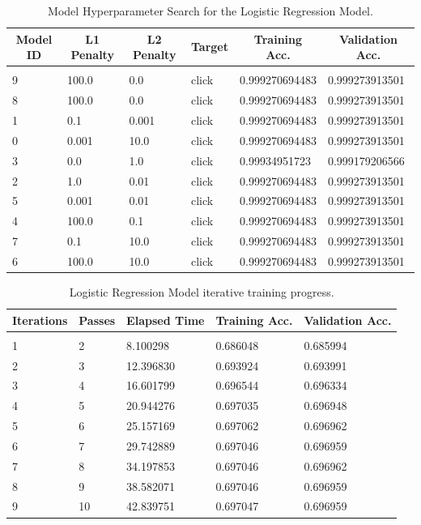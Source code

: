 \documentclass{article} %
\begin{document}
\begin{table}[!htbp]
\caption{Model Hyperparameter Search for the Logistic Regression Model.}
\label{table:19}
\begin{center}
\begin{tabular}{l l l l l l}
\multicolumn{1}{c}{\bf Model ID} & \multicolumn{1}{c}{\bf L1 Penalty} & \multicolumn{1}{c}{\bf L2 Penalty} & \multicolumn{1}{c}{\bf Target} & \multicolumn{1}{c}{\bf Training Acc.} & \multicolumn{1}{c}{\bf Validation Acc.}
\\ \hline \\
9 & 100.0 & 0.0   & click & 0.999270694483 & 0.999273913501\\
8 & 100.0 & 0.0   & click & 0.999270694483 & 0.999273913501\\
1 & 0.1   & 0.001 & click & 0.999270694483 & 0.999273913501\\
0 & 0.001 & 10.0  & click & 0.999270694483 & 0.999273913501\\
3 & 0.0   & 1.0   & click & 0.99934951723  & 0.999179206566\\
2 & 1.0   & 0.01  & click & 0.999270694483 & 0.999273913501\\
5 & 0.001 & 0.01  & click & 0.999270694483 & 0.999273913501\\
4 & 100.0 & 0.1   & click & 0.999270694483 & 0.999273913501\\
7 & 0.1   & 10.0  & click & 0.999270694483 & 0.999273913501\\
6 & 100.0 & 10.0  & click & 0.999270694483 & 0.999273913501\\
\end{tabular}
\end{center}
\end{table}

\begin{table}[!htbp]
\caption{Logistic Regression Model iterative training progress.}
\label{table:20}
\begin{center}
\begin{tabular}{l l l l l}
\multicolumn{1}{c}{\bf Iterations} & \multicolumn{1}{c}{\bf Passes} & \multicolumn{1}{c}{\bf Elapsed Time} & \multicolumn{1}{c}{\bf Training Acc.} & \multicolumn{1}{c}{\bf Validation Acc.}
\\ \hline \\
1 & 2 & 8.100298   & 0.686048 & 0.685994\\
2 & 3 & 12.396830  & 0.693924 & 0.693991\\
3 & 4 & 16.601799  & 0.696544 & 0.696334\\
4 & 5 & 20.944276  & 0.697035 & 0.696948\\
5 & 6 & 25.157169  & 0.697062 & 0.696962\\
6 & 7 & 29.742889  & 0.697046 & 0.696959\\
7 & 8 & 34.197853  & 0.697046 & 0.696962\\
8 & 9 & 38.582071  & 0.697046 & 0.696959\\
9 & 10 & 42.839751 & 0.697047 & 0.696959\\
\end{tabular}
\end{center}
\end{table}
\end{document}
